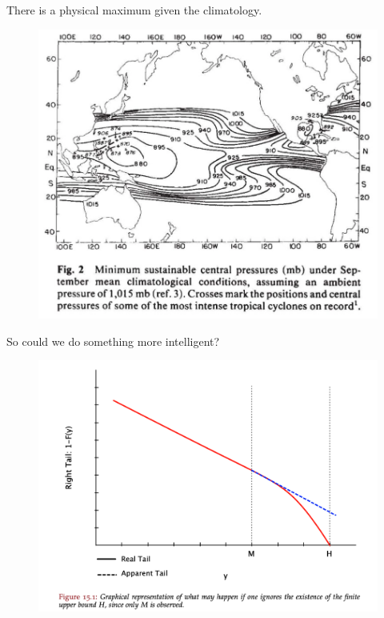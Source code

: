 \begin{frame}{There is a physical maximum given the climatology.}

\vspace{-30pt}
\begin{figure}[htb!]
    \centering
    \includegraphics[width=0.8\linewidth]{images/hurricane-Emanuel-upper-bound.png}
    \vspace{-15pt}
   \caption{\cite{emanuel1987dependence} }
    \label{fig:}
\end{figure}
\end{frame}

\begin{frame}{So could we do something more intelligent?~\cite{taleb2019statistical}}
\vspace{-20pt}
 \begin{minipage}{1.0\textwidth}
\begin{figure}[htb!]
    \centering
    \includegraphics[width=1\linewidth]{images/nnt-upper-bound.png}
    \vspace{-15pt}

\end{figure}
\end{minipage}
\end{frame}
